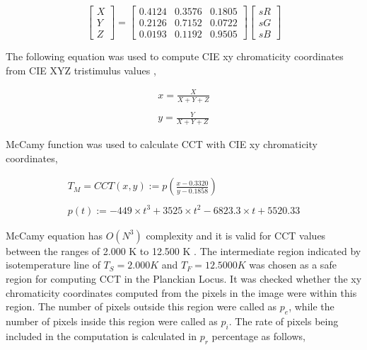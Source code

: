 \documentclass{article}
\begin{document}
\begin{equation}
\begin{bmatrix}
    X\\
    Y\\
    Z
\end{bmatrix}
=
\begin{bmatrix}
    0.4124&0.3576&0.1805\\
    0.2126&0.7152&0.0722\\
    0.0193&0.1192&0.9505
\end{bmatrix}
\begin{bmatrix}
    sR\\ 
    sG\\ 
    sB
\end{bmatrix}
\label{eq:RGB2XYZ}
\end{equation}

The following equation was used to compute CIE xy chromaticity coordinates from CIE XYZ tristimulus values \cite{Wikipedia2005},

\begin{equation}
\begin{matrix}
    x = \frac{X}{X+Y+Z}\\
    \\
    y = \frac{Y}{X+Y+Z}
\end{matrix}
\label{eq:XYZ2xy}
\end{equation}

McCamy function \cite{davis2020correlated} was used to calculate CCT with CIE xy chromaticity coordinates,

\begin{equation}
\begin{matrix}
    T_M = CCT(x, y) := p\left ( \frac{x-0.3320}{y-0.1858} \right )\\
    \\
    p(t) := -449 \times t^3 + 3525 \times t^2 - 6823.3 \times t + 5520.33
\end{matrix}
\label{eq:xy2TM}
\end{equation}

McCamy equation has $O(N^3)$ complexity and it is valid for CCT values between the ranges of 2.000 K to 12.500 K \cite{mccamy1992correlated, mccamy1993correlated}. The intermediate region indicated by isotemperature line of $T_S=2.000 K$ and $T_F=12.5000 K$ was chosen as a safe region for computing CCT in the Planckian Locus. It was checked whether the xy chromaticity coordinates computed from the pixels in the image were within this region. The number of pixels outside this region were called as $p_e$, while the number of pixels inside this region were called as $p_i$. The rate of pixels being included in the computation is calculated in $p_r$ percentage as follows,
\end{document}
